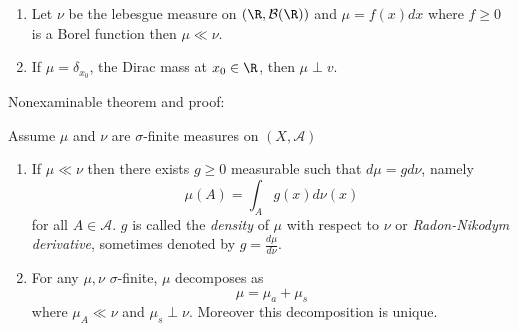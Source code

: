 \documentclass[a4paper]{article}
\begin{document}
\begin{eg}\leavevmode
  \begin{enumerate}
  \item Let \(\nu\) be the lebesgue measure on \((\R, \mathcal B(\R))\) and \(\mu = f(x) dx\) where \(f \geq 0\) is a Borel function then \(\mu \ll \nu\).
  \item If \(\mu = \delta_{x_0}\), the Dirac mass at \(x_0 \in \R\), then \(\mu \perp v\).
  \end{enumerate}
\end{eg}

Nonexaminable theorem and proof:

\begin{theorem}
  Assume \(\mu\) and \(\nu\) are \(\sigma\)-finite measures on \((X, \mathcal A)\)
  \begin{enumerate}
  \item If \(\mu \ll \nu\) then there exists \(g \geq 0\) measurable such that \(d \mu = g d \nu\), namely
    \[
      \mu(A) = \int_A g(x) d \nu(x)
    \]
    for all \(A \in \mathcal A\). \(g\) is called the \emph{density} of \(\mu\) with respect to \(\nu\) or \emph{Radon-Nikodym derivative}, sometimes denoted by \(g = \frac{d\mu}{d\nu}\).
  \item For any \(\mu, \nu\) \(\sigma\)-finite, \(\mu\) decomposes as
    \[
      \mu = \mu_a + \mu_s
    \]
    where \(\mu_A \ll \nu\) and \(\mu_s \perp \nu\). Moreover this decomposition is unique.
  \end{enumerate}
\end{theorem}
\end{document}
